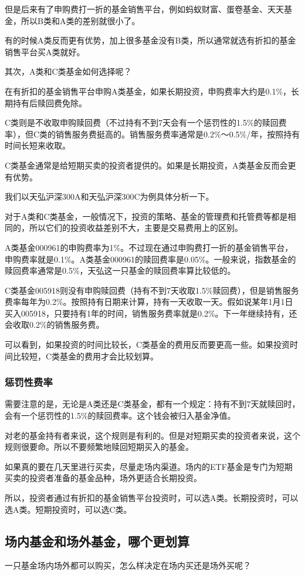 但是后来有了申购费打一折的基金销售平台，例如蚂蚁财富、蛋卷基金、天天基金，所以B类和A类的差别就很小了。

有的时候A类反而更有优势，加上很多基金没有B类，所以通常就选有折扣的基金销售平台买A类就好。

其次，A类和C类基金如何选择呢？

在有折扣的基金销售平台申购A类基金，如果长期投资，申购费率大约是0.1\%，长期持有后赎回费免除。

C类则是不收取申购赎回费（不过持有不到7天会有一个惩罚性的1.5\%的赎回费率），但C类的销售服务费挺高的。销售服务费率通常是0.2\%～0.5\%/年，按照持有时间长短来收取。

C类基金通常是给短期买卖的投资者提供的。如果是长期投资，A类基金反而会更有优势。

我们以天弘沪深300A和天弘沪深300C为例具体分析一下。

对于A类和C类基金，一般情况下，投资的策略、基金的管理费和托管费等都是相同的，所以它们的投资收益差别不大，主要是交易费用上的区别。

A类基金000961的申购费率为1\%。不过现在通过申购费打一折的基金销售平台，申购费率就是0.1\%。A类基金000961的赎回费率是0.05\%。一般来说，指数基金的赎回费率通常是0.5\%，天弘这一只基金的赎回费率算比较低的。

C类基金005918则没有申购赎回费（持有不到7天收取1.5\%赎回费），但是销售服务费率每年为0.2\%。按照持有日期来计算，持有一天收取一天。假如说某年1月1日买入005918，只要持有1年的时间，销售服务费率就是0.2\%。下一年继续持有，还会收取0.2\%的销售服务费。

可以看到，如果投资的时间比较长，C类基金的费用反而要更高一些。如果投资时间比较短，C类基金的费用才会比较划算。

\subsubsection{惩罚性费率}

需要注意的是，无论是A类还是C类基金，都有一个规定：持有不到7天就赎回时，会有一个惩罚性的1.5\%的赎回费率。这个钱会被归入基金净值。

对老的基金持有者来说，这个规则是有利的。但是对短期买卖的投资者来说，这个规则很要命。所以不要频繁地赎回短期买入的基金。

如果真的要在几天里进行买卖，尽量走场内渠道。场内的ETF基金是专门为短期买卖的投资者准备的基金品种，场外更适合长期投资。

所以，投资者通过有折扣的基金销售平台投资时，可以选A类。长期投资时，可以选A类。短期投资时，可以选C类。

\subsection{场内基金和场外基金，哪个更划算}
{\kaishu 一只基金场内场外都可以购买，怎么样决定在场内买还是场外买呢？}

